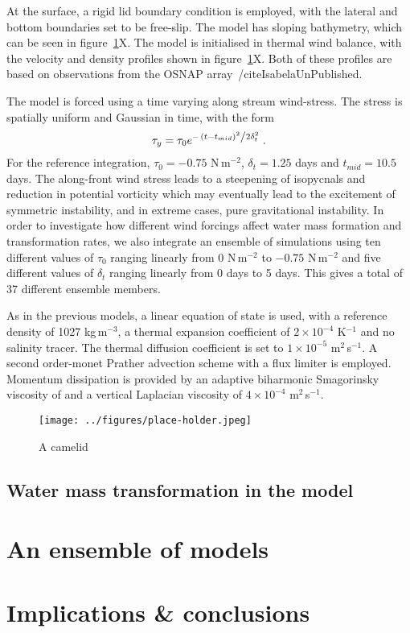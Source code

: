 At the surface, a rigid lid boundary condition is employed, with the lateral and bottom boundaries set to be free-slip. The model has sloping bathymetry, which can be seen in  figure~\ref{fig:ICICs}X. The model is initialised in thermal wind balance, with the velocity and density profiles shown in figure~\ref{fig:ICICs}X. Both of these profiles are based on observations from the OSNAP array~/cite{IsabelaUnPublished}.

The model is forced using a time varying along stream wind-stress. The stress is spatially uniform and Gaussian in time, with the form
\begin{equation}
    \tau_y = \tau_0 e^{-\flatfrac{(t - t_{mid})^2}{2\delta_t^2}} \, .
\end{equation}
For the reference integration, $\tau_0 = - 0.75$ N\,m$^{-2}$, $\delta_t = 1.25$ days and $t_{mid} = 10.5$ days. The along-front wind stress leads to a steepening of isopycnals and reduction in potential vorticity which may eventually lead to the excitement of symmetric instability, and in extreme cases, pure gravitational instability. In order to investigate how different wind forcings affect water mass formation and transformation rates, we also integrate an ensemble of simulations using ten different values of $\tau_0$ ranging linearly from $0$ N\,m$^{-2}$ to $-0.75$ N\,m$^{-2}$ and five different values of $\delta_t$ ranging linearly from 0 days to 5 days. This gives a total of 37 different ensemble members.

As in the previous models, a linear equation of state is used, with a reference density of 1027 kg\,m$^{-3}$, a thermal expansion coefficient of $2 \times 10^{-4}$ K$^{-1}$ and no salinity tracer. The thermal diffusion coefficient is set to $1 \times 10^{-5}$ m$^2$\,s$^{-1}$. A second order-monet Prather advection scheme with a flux limiter is employed. Momentum dissipation is provided by an adaptive biharmonic Smagorinsky viscosity of and a vertical Laplacian viscosity of $4 \times 10^{-4}$ m$^2$\,s$^{-1}$.  

\begin{figure} 
    \centering
    \texttt{[image: ../figures/place-holder.jpeg]}
    \caption{A camelid}
    \label{fig:ICICs}
\end{figure}

\subsection{Water mass transformation in the model}

\section{An ensemble of models}

\section{Implications \& conclusions}